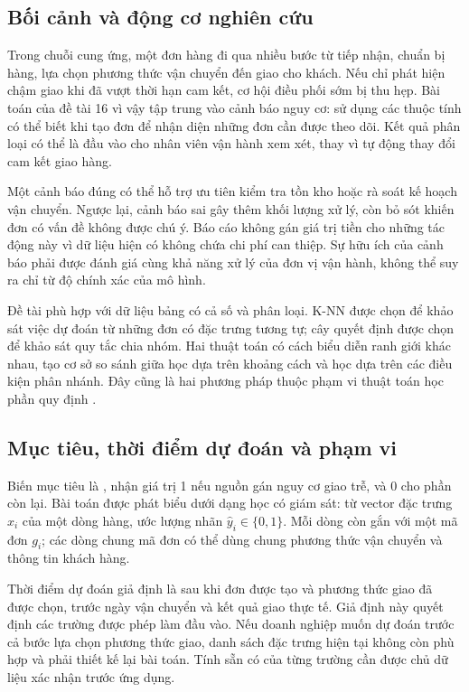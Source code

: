 \subsection{Bối cảnh và động cơ nghiên cứu}
Trong chuỗi cung ứng, một đơn hàng đi qua nhiều bước từ tiếp nhận, chuẩn bị
hàng, lựa chọn phương thức vận chuyển đến giao cho khách. Nếu chỉ phát hiện
chậm giao khi đã vượt thời hạn cam kết, cơ hội điều phối sớm bị thu hẹp.
Bài toán của đề tài 16 vì vậy tập trung vào cảnh báo nguy cơ: sử dụng các
thuộc tính có thể biết khi tạo đơn để nhận diện những đơn cần được theo dõi.
Kết quả phân loại có thể là đầu vào cho nhân viên vận hành xem xét, thay vì
tự động thay đổi cam kết giao hàng.

Một cảnh báo đúng có thể hỗ trợ ưu tiên kiểm tra tồn kho hoặc rà soát kế
hoạch vận chuyển. Ngược lại, cảnh báo sai gây thêm khối lượng xử lý, còn bỏ
sót khiến đơn có vấn đề không được chú ý. Báo cáo không gán giá trị tiền cho
những tác động này vì dữ liệu hiện có không chứa chi phí can thiệp. Sự hữu
ích của cảnh báo phải được đánh giá cùng khả năng xử lý của đơn vị vận hành,
không thể suy ra chỉ từ độ chính xác của mô hình.

Đề tài phù hợp với dữ liệu bảng có cả số và phân loại. K-NN được chọn để
khảo sát việc dự đoán từ những đơn có đặc trưng tương tự; cây quyết định
được chọn để khảo sát quy tắc chia nhóm. Hai thuật toán có cách biểu diễn
ranh giới khác nhau, tạo cơ sở so sánh giữa học dựa trên khoảng cách và học
dựa trên các điều kiện phân nhánh. Đây cũng là hai phương pháp thuộc phạm
vi thuật toán học phần quy định \cite{fit}.

\subsection{Mục tiêu, thời điểm dự đoán và phạm vi}
Biến mục tiêu là , nhận giá trị 1 nếu nguồn gán
nguy cơ giao trễ, và 0 cho phần còn lại. Bài toán được phát biểu dưới dạng
học có giám sát: từ vector đặc trưng $x_i$ của một dòng hàng, ước lượng nhãn
$\hat y_i\in\{0,1\}$. Mỗi dòng còn gắn với một mã đơn $g_i$; các dòng chung
mã đơn có thể dùng chung phương thức vận chuyển và thông tin khách hàng.

Thời điểm dự đoán giả định là sau khi đơn được tạo và phương thức giao đã
được chọn, trước ngày vận chuyển và kết quả giao thực tế. Giả định này quyết
định các trường được phép làm đầu vào. Nếu doanh nghiệp muốn dự đoán trước
cả bước lựa chọn phương thức giao, danh sách đặc trưng hiện tại không còn
phù hợp và phải thiết kế lại bài toán. Tính sẵn có của từng trường cần được
chủ dữ liệu xác nhận trước ứng dụng.

